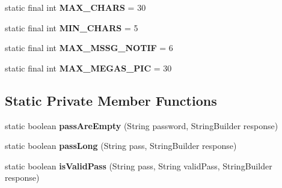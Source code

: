 \begin{DoxyCompactItemize}
\item 
static final int {\bfseries M\+A\+X\+\_\+\+C\+H\+A\+RS} = 30\hypertarget{classcom_1_1example_1_1sebastian_1_1tindertp_1_1commonTools_1_1Common_a33e2e3466136affefb31e64904d2885e}{}\label{classcom_1_1example_1_1sebastian_1_1tindertp_1_1commonTools_1_1Common_a33e2e3466136affefb31e64904d2885e}

\item 
static final int {\bfseries M\+I\+N\+\_\+\+C\+H\+A\+RS} = 5\hypertarget{classcom_1_1example_1_1sebastian_1_1tindertp_1_1commonTools_1_1Common_a56ede645d88610afb984ef92a595dc07}{}\label{classcom_1_1example_1_1sebastian_1_1tindertp_1_1commonTools_1_1Common_a56ede645d88610afb984ef92a595dc07}

\item 
static final int {\bfseries M\+A\+X\+\_\+\+M\+S\+S\+G\+\_\+\+N\+O\+T\+IF} = 6\hypertarget{classcom_1_1example_1_1sebastian_1_1tindertp_1_1commonTools_1_1Common_a6ce4f54e49fdc36622c4ba2ce24c9e3c}{}\label{classcom_1_1example_1_1sebastian_1_1tindertp_1_1commonTools_1_1Common_a6ce4f54e49fdc36622c4ba2ce24c9e3c}

\item 
static final int {\bfseries M\+A\+X\+\_\+\+M\+E\+G\+A\+S\+\_\+\+P\+IC} = 30\hypertarget{classcom_1_1example_1_1sebastian_1_1tindertp_1_1commonTools_1_1Common_ad3c210687394f5705170772645cda6a6}{}\label{classcom_1_1example_1_1sebastian_1_1tindertp_1_1commonTools_1_1Common_ad3c210687394f5705170772645cda6a6}

\end{DoxyCompactItemize}
\subsection*{Static Private Member Functions}
\begin{DoxyCompactItemize}
\item 
static boolean {\bfseries pass\+Are\+Empty} (String password, String\+Builder response)\hypertarget{classcom_1_1example_1_1sebastian_1_1tindertp_1_1commonTools_1_1Common_a824d7411383e3fa2a7c3d9754ee0e950}{}\label{classcom_1_1example_1_1sebastian_1_1tindertp_1_1commonTools_1_1Common_a824d7411383e3fa2a7c3d9754ee0e950}

\item 
static boolean {\bfseries pass\+Long} (String pass, String\+Builder response)\hypertarget{classcom_1_1example_1_1sebastian_1_1tindertp_1_1commonTools_1_1Common_a5e66efe07443c8aadee9736fb637602a}{}\label{classcom_1_1example_1_1sebastian_1_1tindertp_1_1commonTools_1_1Common_a5e66efe07443c8aadee9736fb637602a}

\item 
static boolean {\bfseries is\+Valid\+Pass} (String pass, String valid\+Pass, String\+Builder response)\hypertarget{classcom_1_1example_1_1sebastian_1_1tindertp_1_1commonTools_1_1Common_ab158e181e1bf6ff713f78dd6fd12b10b}{}\label{classcom_1_1example_1_1sebastian_1_1tindertp_1_1commonTools_1_1Common_ab158e181e1bf6ff713f78dd6fd12b10b}

\end{DoxyCompactItemize}
